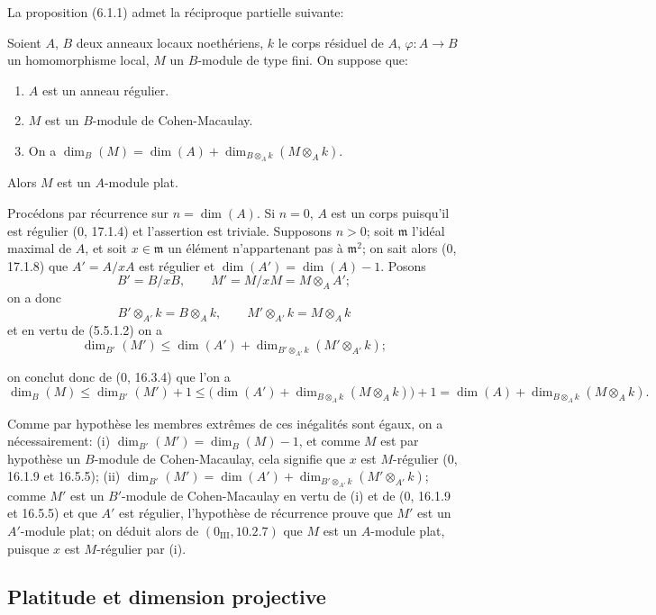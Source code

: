 La proposition (6.1.1) admet la réciproque partielle suivante:

\begin{proposition}[6.1.5]
\label{IV.2.s6.1.5-fr}
Soient $A$, $B$ deux anneaux locaux noethériens, $k$ le corps résiduel de
$A$, $\varphi:A\to B$ un homomorphisme local, $M$ un $B$-module de type fini.
On suppose que:
\begin{enumerate}
\item[1\textsuperscript{o}] $A$ est un anneau régulier.
\item[2\textsuperscript{o}] $M$ est un $B$-module de Cohen-Macaulay.
\item[3\textsuperscript{o}] On a
$\dim_B(M)=\dim(A)+\dim_{B\otimes_Ak}(M\otimes_Ak)$.
\end{enumerate}
Alors $M$ est un $A$-module plat.
\end{proposition}

Procédons par récurrence sur $n=\dim(A)$. Si $n=0$, $A$ est un corps
puisqu'il est régulier (0, 17.1.4) et l'assertion est triviale. Supposons
$n>0$; soit $\mathfrak m$ l'idéal maximal de $A$, et soit
$x\in\mathfrak m$ un élément n'appartenant pas à $\mathfrak m^2$; on sait
alors (0, 17.1.8) que $A'=A/xA$ est régulier et
$\dim(A')=\dim(A)-1$. Posons
\[
B'=B/xB,\qquad M'=M/xM=M\otimes_AA';
\]
on a donc
\[
B'\otimes_{A'}k=B\otimes_Ak,\qquad
M'\otimes_{A'}k=M\otimes_Ak
\]
et en vertu de (5.5.1.2) on a
\[
\dim_{B'}(M')\leq\dim(A')+
\dim_{B'\otimes_{A'}k}(M'\otimes_{A'}k);
\]


on conclut donc de (0, 16.3.4) que l'on a
\[
\dim_B(M)\leq\dim_{B'}(M')+1
\leq\bigl(\dim(A')+
\dim_{B\otimes_Ak}(M\otimes_Ak)\bigr)+1
=\dim(A)+\dim_{B\otimes_Ak}(M\otimes_Ak).
\]

Comme par hypothèse les membres extrêmes de ces inégalités sont égaux, on
a nécessairement: (i) $\dim_{B'}(M')=\dim_B(M)-1$, et comme $M$ est par
hypothèse un $B$-module de Cohen-Macaulay, cela signifie que $x$ est
$M$-régulier (0, 16.1.9 et 16.5.5); (ii)
$\dim_{B'}(M')=\dim(A')+
\dim_{B'\otimes_{A'}k}(M'\otimes_{A'}k)$; comme $M'$ est un $B'$-module de
Cohen-Macaulay en vertu de (i) et de (0, 16.1.9 et 16.5.5) et que $A'$ est
régulier, l'hypothèse de récurrence prouve que $M'$ est un $A'$-module plat;
on déduit alors de $(0_{\mathrm{III}}, 10.2.7)$ que $M$ est un $A$-module
plat, puisque $x$ est $M$-régulier par (i).

\subsection{Platitude et dimension projective}

